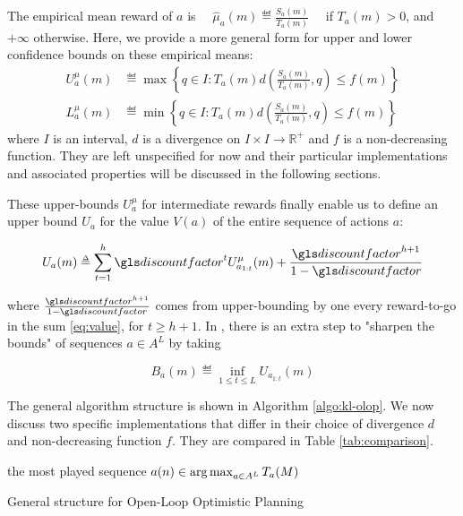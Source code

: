 \noindent
The empirical mean reward of $a$ is
$\quad\displaystyle{ \hat{\mu}_a(m) \eqdef \frac{S_a(m)}{T_a(m)}} \quad $
if $T_a(m) > 0$, and $+\infty$ otherwise. Here, we provide a more general form for upper and lower confidence bounds on these empirical means:
\begin{align}
\label{eq:u_mu_a_m}
U^{\mu}_a(m) &\eqdef \max \left\{q\in I: T_a(m) d(\frac{S_a(m)}{T_a(m)}, q) \leq f(m) \right\}\\
L^{\mu}_a(m) &\eqdef \min \left\{q\in I: T_a(m) d(\frac{S_a(m)}{T_a(m)}, q) \leq f(m) \right\}
\end{align}
where $I$ is an interval, $d$ is a divergence on $I\times I \rightarrow \mathbb{R^+}$ and $f$ is a non-decreasing function. They are left unspecified for now and their particular implementations and associated properties will be discussed in the following sections.

These upper-bounds $U^{\mu}_a$ for intermediate rewards finally enable us to define an upper bound $U_a$ for the value $V(a)$ of the entire sequence of actions $a$:

\begin{equation}
\label{eq:Ua}
U_a(m) \eqdef \sum_{t=1}^h \discount^t U^{\mu}_{a_{1:t}}(m) + \frac{\discount^{h+1}}{1-\discount}
\end{equation}


\noindent
where $\frac{\discount^{h+1}}{1-\discount}$ comes from upper-bounding by one every reward-to-go in the sum \eqref{eq:value}, for $t\geq h+1$. In \citep{Bubeck2010}, there is an extra step to "sharpen the bounds" of sequences $a \in A^L$ by taking


\begin{equation}
\label{eq:Ba}
B_a(m) \eqdef \inf_{1 \leq t \leq L} U_{a_{1:t}}(m)
\end{equation}


The general algorithm structure is shown in Algorithm \ref{algo:kl-olop}.
We now discuss two specific implementations that differ in their choice of divergence $d$ and non-decreasing function $f$. They are compared in Table \ref{tab:comparison}.

\begin{algorithm}[tp]
	\DontPrintSemicolon
	\Return the most played sequence $a(n) \in \operatorname*{arg\,max}_{a\in A^L} T_a(M)$
	\caption{General structure for Open-Loop Optimistic Planning}
	\label{algo:kl-olop}
\end{algorithm}

